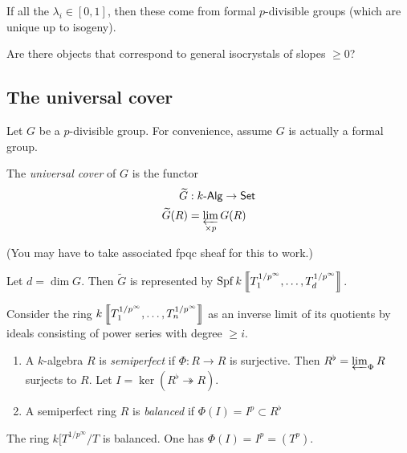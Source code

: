 If all the $\lambda_i\in [0,1]$, then these come from formal $p$-divisible groups 
(which are unique up to isogeny). 

\begin{question}
Are there objects that correspond to general isocrystals of slopes $\geqslant 0$? 
\end{question}





\subsection{The universal cover}

Let $G$ be a $p$-divisible group. For convenience, assume $G$ is actually a formal 
group. 

\begin{definition}
The \emph{universal cover} of $G$ is the functor 
\begin{align*}
  \widetilde G &:k\textnormal{-}\mathsf{Alg} \to \mathsf{Set} \\
  \widetilde G(R) &= \varprojlim_{\times p} G(R) 
\end{align*}
\end{definition}
(You may have to take associated fpqc sheaf for this to work.)

\begin{proposition}
Let $d=\dim G$. Then $\widetilde G$ is represented by 
$\operatorname{Spf} k\left\llbracket {T_1^{1/p^\infty},\dots,T_d^{1/p^\infty}} \right\rrbracket$. 
\end{proposition}

Consider the ring $k\left\llbracket {T_1^{1/p^\infty},\dots,T_n^{1/p^\infty}} \right\rrbracket$ as an inverse limit 
of its quotients by ideals consisting of power series with degree 
$\geqslant i$. 

\begin{definition}
\begin{enumerate}
  \item A $k$-algebra $R$ is \emph{semiperfect} if $\Phi:R\to R$ is surjective. Then 
    $R^\flat=\varprojlim_\Phi R$ surjects to $R$. Let 
    $I=\ker(R^\flat\twoheadrightarrow R)$. 
  \item A semiperfect ring $R$ is \emph{balanced} if $\Phi(I) = I^p\subset R^\flat$
\end{enumerate}
\end{definition}

\begin{example}
The ring $k[T^{1/p^\infty}/T$ is balanced. One has $\Phi(I)=I^p=(T^p)$. 
\end{example}

